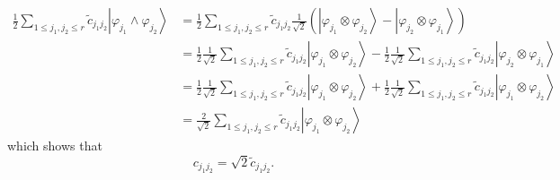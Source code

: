\documentclass[preprint,aps,showkeys]{revtex4}%
\begin{document}
\begin{align}
\frac{1}{2}\sum_{1\leq j_{1},j_{2}\leq r}\tilde{c}_{j_{1}j_{2}}\left\vert
\varphi_{j_{1}}\wedge\varphi_{j_{2}}\right\rangle  &  =\frac{1}{2}\sum_{1\leq
j_{1},j_{2}\leq r}\tilde{c}_{j_{1}j_{2}}\frac{1}{\sqrt{2}}\left(  \left\vert
\varphi_{j_{1}}\otimes\varphi_{j_{2}}\right\rangle -\left\vert \varphi_{j_{2}%
}\otimes\varphi_{j_{1}}\right\rangle \right) \nonumber\\
&  =\frac{1}{2}\frac{1}{\sqrt{2}}\sum_{1\leq j_{1},j_{2}\leq r}\tilde
{c}_{j_{1}j_{2}}\left\vert \varphi_{j_{1}}\otimes\varphi_{j_{2}}\right\rangle
-\frac{1}{2}\frac{1}{\sqrt{2}}\sum_{1\leq j_{1},j_{2}\leq r}\tilde{c}%
_{j_{1}j_{2}}\left\vert \varphi_{j_{2}}\otimes\varphi_{j_{1}}\right\rangle
\nonumber\\
&  =\frac{1}{2}\frac{1}{\sqrt{2}}\sum_{1\leq j_{1},j_{2}\leq r}\tilde
{c}_{j_{1}j_{2}}\left\vert \varphi_{j_{1}}\otimes\varphi_{j_{2}}\right\rangle
+\frac{1}{2}\frac{1}{\sqrt{2}}\sum_{1\leq j_{1},j_{2}\leq r}\tilde{c}%
_{j_{1}j_{2}}\left\vert \varphi_{j_{1}}\otimes\varphi_{j_{2}}\right\rangle
\nonumber\\
&  =\frac{2}{\sqrt{2}}\sum_{1\leq j_{1},j_{2}\leq r}\tilde{c}_{j_{1}j_{2}%
}\left\vert \varphi_{j_{1}}\otimes\varphi_{j_{2}}\right\rangle
\end{align}
which shows that
\begin{equation}
c_{j_{1}j_{2}}=\sqrt{2}\tilde{c}_{j_{1}j_{2}}.
\end{equation}
\end{document}
